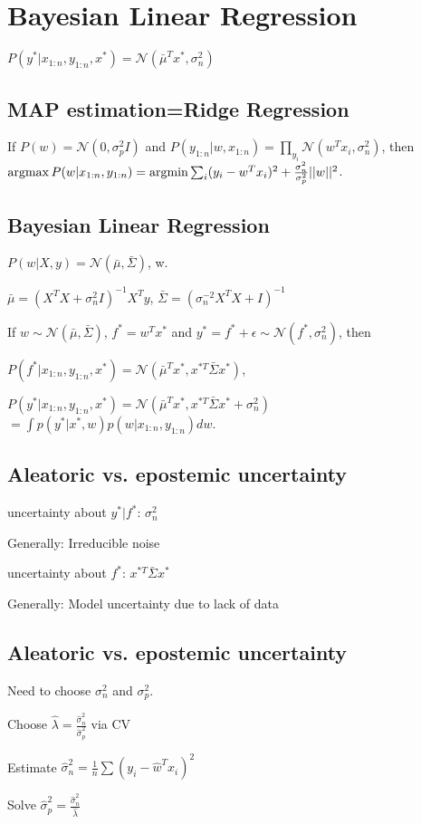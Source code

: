 \section{Bayesian Linear Regression}
$P(y^*|x_{1:n},y_{1:n},x^*)=\mathcal{N}(\bar{\mu}^Tx^*,\sigma_n^2)$
\subsection*{MAP estimation=Ridge Regression}
If $P(w)=\mathcal{N}(0,\sigma_p^2I)$ and $P(y_{1:n}|w,x_{1:n})=\prod_{y_i} \mathcal{N}(w^Tx_i,\sigma_n^2)$, then $\operatorname*{argmax} P(w|x_{1:n},y_{1:n})=\operatorname*{argmin} \sum_i (y_i-w^Tx_i)^2+\frac{\sigma_n^2}{\sigma_p^2}||w||^2$.
\subsection*{Bayesian Linear Regression}
 $P(w|X,y)=\mathcal{N}(\bar{\mu},\bar{\Sigma})$, w.

$\bar{\mu}=(X^TX+\sigma_n^2I)^{-1}X^Ty$, 
$\bar{\Sigma}=(\sigma_n^{-2}X^TX+I)^{-1}$

 If $w\sim\mathcal{N}(\bar{\mu},\bar{\Sigma})$, $f^*=w^Tx^*$ and $y^*=f^*+\epsilon\sim\mathcal{N}(f^*,\sigma_n^2)$, then
\begin{inparaitem}[$\color{mygreen} \triangleright$]
\item $P(f^*|x_{1:n},y_{1:n},x^*)=\mathcal{N}(\bar{\mu}^Tx^*,x^{*T}\bar{\Sigma}x^*)$,
\item $P(y^*|x_{1:n},y_{1:n},x^*)=\mathcal{N}(\bar{\mu}^Tx^*,x^{*T}\bar{\Sigma}x^*+\sigma_n^2)$ $=\int p(y^*|x^*,w)p(w|x_{1:n},y_{1:n})dw$.
\end{inparaitem}

\subsection*{Aleatoric vs. epostemic uncertainty}
 uncertainty about $y^*|f^*$: $\sigma_n^2$

Generally: Irreducible noise

 uncertainty about $f^*$: $x^{*T}\bar{\Sigma}x^*$ 

Generally: Model uncertainty due to lack of data

\subsection*{Aleatoric vs. epostemic uncertainty}
Need to choose $\sigma_n^2$ and $\sigma_p^2$.

\begin{inparaitem}[$\color{mygreen} \triangleright$]
\item Choose $\hat{\lambda}=\frac{\hat{\sigma}_n^2}{\hat{\sigma}_p^2}$ via CV

\item Estimate $\hat{\sigma}_n^2=\frac{1}{n}\sum(y_i-\hat{w}^T x_i)^2$

\item Solve $\hat{\sigma}_p^2=\frac{\hat{\sigma}_n^2}{\hat{\lambda}}$
\end{inparaitem}